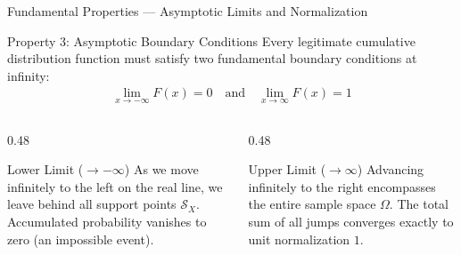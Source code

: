\documentclass[aspectratio=169,xcolor={dvipsnames,table}]{beamer}
\begin{document}
\begin{frame}{Fundamental Properties --- Asymptotic Limits and Normalization}
	\begin{block}{Property 3: Asymptotic Boundary Conditions}
		\small
		Every legitimate cumulative distribution function must satisfy two fundamental boundary conditions at infinity:
		\begin{align*}
			\lim_{x \to -\infty} F(x) = 0 \quad \text{and} \quad \lim_{x \to \infty} F(x) = 1
		\end{align*}
	\end{block}
	\vspace{-0.15cm}
	\begin{columns}[T]
		\begin{column}{0.48\textwidth}
			\begin{alertblock}{Lower Limit ($\to -\infty$)}
				\footnotesize
				As we move infinitely to the left on the real line, we leave behind all support points $\mathcal{S}_X$. Accumulated probability vanishes to zero (an impossible event).
			\end{alertblock}
		\end{column}
		\begin{column}{0.48\textwidth}
			\begin{exampleblock}{Upper Limit ($\to \infty$)}
				\footnotesize
				Advancing infinitely to the right encompasses the entire sample space $\Omega$. The total sum of all jumps converges exactly to unit normalization $1$.
			\end{exampleblock}
		\end{column}
	\end{columns}
\end{frame}
\end{document}
